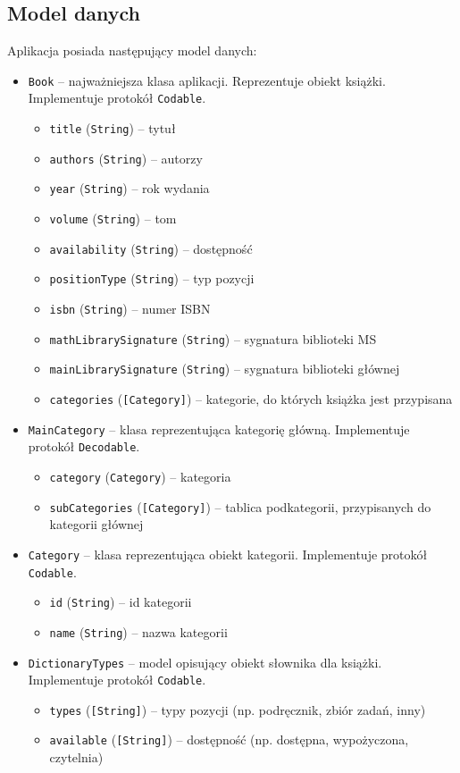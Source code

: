 \documentclass[twoside]{projektInzynierskiMS}
\begin{document}
\subsection{Model danych}
Aplikacja posiada następujący model danych:
\begin{itemize}
\item \verb`Book` -- najważniejsza klasa aplikacji. Reprezentuje obiekt książki. Implementuje protokół \verb`Codable`.
\begin{itemize}
\item \verb`title` (\verb`String`) -- tytuł
\item \verb`authors` (\verb`String`) -- autorzy
\item \verb`year` (\verb`String`) -- rok wydania
\item \verb`volume` (\verb`String`) -- tom
\item \verb`availability` (\verb`String`) -- dostępność
\item \verb`positionType` (\verb`String`) -- typ pozycji
\item \verb`isbn` (\verb`String`) -- numer ISBN
\item \verb`mathLibrarySignature` (\verb`String`) -- sygnatura biblioteki MS
\item \verb`mainLibrarySignature` (\verb`String`) -- sygnatura biblioteki głównej
\item \verb`categories` (\verb`[Category]`) -- kategorie, do których książka jest przypisana
\end{itemize}
\item \verb`MainCategory` -- klasa reprezentująca kategorię główną. Implementuje protokół \verb`Decodable`.
\begin{itemize}
\item \verb`category` (\verb`Category`) -- kategoria
\item \verb`subCategories` (\verb`[Category]`) -- tablica podkategorii, przypisanych do kategorii głównej
\end{itemize}
\item \verb`Category` -- klasa reprezentująca obiekt kategorii. Implementuje protokół \verb`Codable`.
\begin{itemize}
\item \verb`id` (\verb`String`) -- id kategorii
\item \verb`name` (\verb`String`) -- nazwa kategorii
\end{itemize}
\item \verb`DictionaryTypes` -- model opisujący obiekt słownika dla książki. Implementuje protokół \verb`Codable`.
\begin{itemize}
\item \verb`types` (\verb`[String]`) -- typy pozycji (np. podręcznik, zbiór zadań, inny)
\item \verb`available` (\verb`[String]`) -- dostępność (np. dostępna, wypożyczona, czytelnia)
\end{itemize}
\end{itemize}
\end{document}

